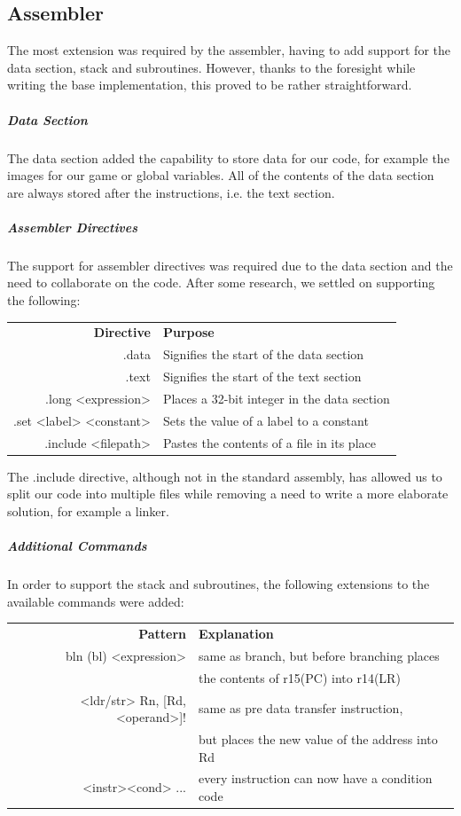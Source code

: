 \documentclass[11pt]{article}
\begin{document}
\subsection*{Assembler}
The most extension was required by the assembler, having to add support for the data section, stack and subroutines. However, thanks to the foresight while writing the base implementation, this proved to be rather straightforward.
\subparagraph*{Data Section}
The data section added the capability to store data for our code, for example the images for our game or global variables. All of the contents of the data section are always stored after the instructions, i.e. the text section.
\subparagraph*{Assembler Directives} The support for assembler directives was required due to the data section and the need to collaborate on the code. After some research, we settled on supporting the following:
\begin{center}
	\begin{tabular}{r|l}
		\textbf{Directive} & \textbf{Purpose} \\
		.data & Signifies the start of the data section \\
		.text & Signifies the start of the text section \\
		.long <expression> & Places a 32-bit integer in the data section \\
		.set <label> <constant> & Sets the value of a label to a constant \\
		.include <filepath> & Pastes the contents of a file in its place
	\end{tabular}
\end{center}
The .include directive, although not in the standard assembly, has allowed us to split our code into multiple files while removing a need to write a more elaborate solution, for example a linker.
\subparagraph*{Additional Commands}
In order to support the stack and subroutines, the following extensions to the available commands were added:
\begin{center}
	\begin{tabular}{r|l}
		\textbf{Pattern} & \textbf{Explanation} \\
		bln (bl) <expression> & same as branch, but before branching places \\
		                      & the contents of r15(PC) into r14(LR) \\
		<ldr/str> Rn, [Rd, <operand>]! & same as pre data transfer instruction, \\
		                               & but places the new value of the address into Rd \\
		<instr><cond> ... & every instruction can now have a condition code
	\end{tabular}
\end{center}
\end{document}
